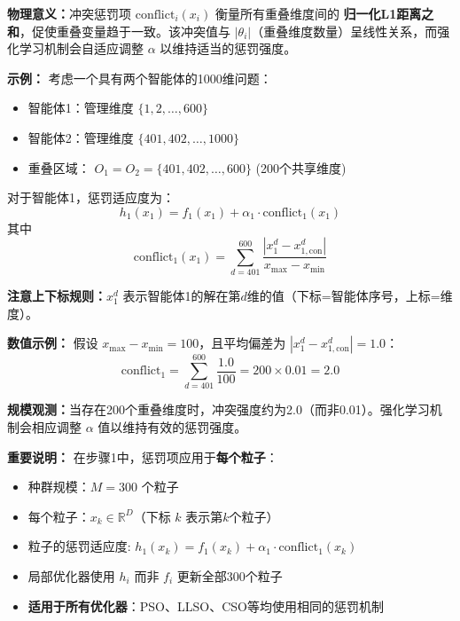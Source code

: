 \documentclass[11pt,a3paper]{ctexart}
\begin{document}
\textbf{物理意义：}冲突惩罚项 $\text{conflict}_i(x_i)$ 衡量所有重叠维度间的 \textbf{归一化L1距离之和}，促使重叠变量趋于一致。该冲突值与 $|\theta_i|$（重叠维度数量）呈线性关系，而强化学习机制会自适应调整 $\alpha$ 以维持适当的惩罚强度。

\textbf{示例：} 考虑一个具有两个智能体的1000维问题：
\begin{itemize}
    \item 智能体1：管理维度 $\{1, 2, \ldots, 600\}$
    \item 智能体2：管理维度 $\{401, 402, \ldots, 1000\}$
    \item 重叠区域： $O_1 = O_2 = \{401, 402, \ldots, 600\}$ (200个共享维度)
\end{itemize}

对于智能体1，惩罚适应度为：
\begin{equation}
h_1(x_1) = f_1(x_1) + \alpha_1 \cdot \text{conflict}_1(x_1)
\end{equation}
其中
\begin{equation}
\text{conflict}_1(x_1) = \sum_{d=401}^{600} \frac{|x_1^d - x_{1,\text{con}}^d|}{x_{\max} - x_{\min}}
\end{equation}

\textbf{注意上下标规则：}$x_1^d$ 表示智能体1的解在第$d$维的值（下标=智能体序号，上标=维度）。

\textbf{数值示例：} 假设 $x_{\max} - x_{\min} = 100$，且平均偏差为 $|x_1^d - x_{1,\text{con}}^d| = 1.0$：
\begin{equation}
\text{conflict}_1 = \sum_{d=401}^{600} \frac{1.0}{100} = 200 \times 0.01 = 2.0
\end{equation}

\textbf{规模观测：}当存在200个重叠维度时，冲突强度约为2.0（而非0.01）。强化学习机制会相应调整 $\alpha$ 值以维持有效的惩罚强度。

\textbf{重要说明：} 在步骤1中，惩罚项应用于\textbf{每个粒子}：
\begin{itemize}
    \item 种群规模：$M = 300$ 个粒子
    \item 每个粒子：$x_k \in \mathbb{R}^{D}$（下标 $k$ 表示第$k$个粒子）
    \item 粒子的惩罚适应度: $h_1(x_k) = f_1(x_k) + \alpha_1 \cdot \text{conflict}_1(x_k)$
    \item 局部优化器使用 $h_i$ 而非 $f_i$ 更新全部300个粒子
    \item \textbf{适用于所有优化器}：PSO、LLSO、CSO等均使用相同的惩罚机制
\end{itemize}
\end{document}
